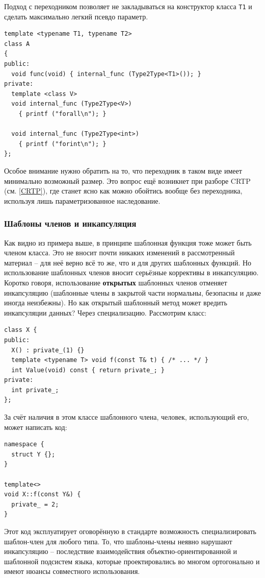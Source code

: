 \documentclass[a4paper,12pt,oneside]{article}
\begin{document}
Подход с переходником позволяет не закладываться на конструктор класса \lstinline!T1! и сделать максимально легкий псевдо параметр.

\begin{lstlisting}
template <typename T1, typename T2>
class A
{
public:
  void func(void) { internal_func (Type2Type<T1>()); }
private:
  template <class V>
  void internal_func (Type2Type<V>)
    { printf ("forall\n"); }

  void internal_func (Type2Type<int>)
    { printf ("forint\n"); }
};
\end{lstlisting}

Особое внимание нужно обратить на то, что переходник в таком виде имеет минимально возможный размер. Это вопрос ещё возникнет при разборе CRTP (см. \ref{CRTP}), где станет ясно как можно обойтись вообще без переходника, используя лишь параметризованное наследование.
\fi

\subsubsection{Шаблоны членов и инкапсуляция}\label{TemplMembersEncapsulation}

Как видно из примера выше, в принципе шаблонная функция тоже может быть членом класса. Это не вносит почти никаких изменений в рассмотренный материал -- для неё верно всё то же, что и для других шаблонных функций. Но использование шаблонных членов вносит серьёзные коррективы в инкапсуляцию. Коротко говоря, использование \textbf{открытых} шаблонных членов отменяет инкапсуляцию (шаблонные члены в закрытой части нормальны, безопасны и даже иногда неизбежны). Но как открытый шаблонный метод может вредить инкапсуляции данных? Через специализацию. Рассмотрим класс:

\begin{lstlisting}
class X {
public:
  X() : private_(1) {}
  template <typename T> void f(const T& t) { /* ... */ }
  int Value(void) const { return private_; }
private:
  int private_;  
};
\end{lstlisting}

За счёт наличия в этом классе шаблонного члена, человек, использующий его, может написать код:

\begin{lstlisting}
namespace {
  struct Y {};
}

template<>
void X::f(const Y&) {
  private_ = 2;
}
\end{lstlisting}

Этот код эксплуатирует оговорённую в стандарте возможность специализировать шаблон-член для любого типа. То, что шаблоны-члены неявно нарушают инкапсуляцию -- последствие взаимодействия объектно-ориентированной и шаблонной подсистем языка, которые проектировались во многом ортогонально и имеют нюансы совместного использования.
\end{document}
